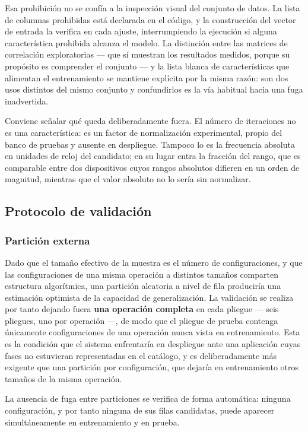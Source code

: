 \documentclass[12pt,oneside,spanish]{book}
\begin{document}
Esa prohibición no se confía a la inspección visual del conjunto de datos. La lista de columnas prohibidas está declarada en el código, y la construcción del vector de entrada la verifica en cada ajuste, interrumpiendo la ejecución si alguna característica prohibida alcanza el modelo. La distinción entre las matrices de correlación exploratorias --- que sí muestran los resultados medidos, porque su propósito es comprender el conjunto --- y la lista blanca de características que alimentan el entrenamiento se mantiene explícita por la misma razón: son dos usos distintos del mismo conjunto y confundirlos es la vía habitual hacia una fuga inadvertida.

Conviene señalar qué queda deliberadamente fuera. El número de iteraciones no es una característica: es un factor de normalización experimental, propio del banco de pruebas y ausente en despliegue. Tampoco lo es la frecuencia absoluta en unidades de reloj del candidato; en su lugar entra la fracción del rango, que es comparable entre dos dispositivos cuyos rangos absolutos difieren en un orden de magnitud, mientras que el valor absoluto no lo sería sin normalizar.

\subsection{Protocolo de validación}
\label{sec:fase2-validacion}

\subsubsection*{Partición externa}

Dado que el tamaño efectivo de la muestra es el número de configuraciones, y que las configuraciones de una misma operación a distintos tamaños comparten estructura algorítmica, una partición aleatoria a nivel de fila produciría una estimación optimista de la capacidad de generalización. La validación se realiza por tanto dejando fuera \textbf{una operación completa} en cada pliegue --- seis pliegues, uno por operación ---, de modo que el pliegue de prueba contenga únicamente configuraciones de una operación nunca vista en entrenamiento. Esta es la condición que el sistema enfrentaría en despliegue ante una aplicación cuyas fases no estuvieran representadas en el catálogo, y es deliberadamente más exigente que una partición por configuración, que dejaría en entrenamiento otros tamaños de la misma operación.

La ausencia de fuga entre particiones se verifica de forma automática: ninguna configuración, y por tanto ninguna de sus filas candidatas, puede aparecer simultáneamente en entrenamiento y en prueba.
\end{document}
